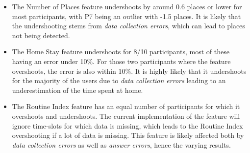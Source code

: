\begin{itemize}
    \item The Number of Places feature undershoots by around 0.6 places or lower for most participants, with P7 being an outlier with -1.5 places. It is likely that the undershooting stems from \textit{data collection errors}, which can lead to places not being detected.

    \item The Home Stay feature undershoots for 8/10 participants, most of these having an error under 10\%. For those two participants where the feature overshoots, the error is also within 10\%. It is highly likely that it undershoots for the majority of the users due to \textit{data collection errors} leading to an underestimation of the time spent at home.

    \item The Routine Index feature has an equal number of participants for which it overshoots and undershoots. The current implementation of the feature will ignore time-slots for which data is missing, which leads to the Routine Index overshooting if a lot of data is missing. This feature is likely affected both by \textit{data collection errors} as well as \textit{answer errors}, hence the varying results.
\end{itemize}

